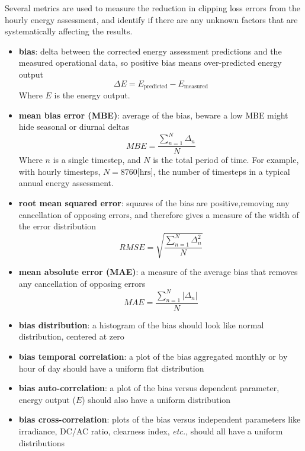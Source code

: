 \documentclass[conference]{IEEEtran}
\begin{document}
Several metrics are used to measure the reduction in clipping loss errors from the hourly energy assessment, and identify if there are any unknown factors that are systematically affecting the results.

\begin{itemize}
\item \textbf{bias}: delta between the corrected energy assessment predictions and the measured operational data, so positive bias means over-predicted energy output 
\begin{equation}
\Delta E={E_\text{predicted}} - {E_\text{measured}}\label{eq:bias}
\end{equation}
Where $E$ is the energy output.
\item \textbf{mean bias error (MBE)}: average of the bias, beware a low MBE might hide seasonal or diurnal deltas
\begin{equation}
\mathit{MBE}=\frac{\sum_{n=1}^N{\Delta_n}}{N}\label{eq:mbe}
\end{equation}
Where $n$ is a single timestep, and $N$ is the total period of time. For example, with hourly timesteps, $N=8760\text{[hrs]}$, the number of timesteps in a typical annual energy assessment.
\item \textbf{root mean squared error}: squares of the bias are positive,removing any cancellation of opposing errors, and therefore gives a measure of the width of the error distribution
\begin{equation}
\mathit{RMSE}=\sqrt{\frac{\sum_{n=1}^N{\Delta_n^2}}{N}}\label{eq:rmse}
\end{equation}
\item \textbf{mean absolute error (MAE)}: a measure of the average bias that removes any cancellation of opposing errors
\begin{equation}
\mathit{MAE}=\frac{\sum_{n=1}^N{\left|\Delta_n\right|}}{N}\label{eq:mae}
\end{equation}
\item \textbf{bias distribution}: a histogram of the bias should look like normal distribution, centered at zero
\item \textbf{bias temporal correlation}: a plot of the bias aggregated monthly or by hour of day should have a uniform flat distribution
\item \textbf{bias auto-correlation}: a plot of the bias versus dependent parameter, energy output ($E$) should also have a uniform distribution
\item \textbf{bias cross-correlation}: plots of the bias versus independent parameters like irradiance, DC/AC ratio, clearness index, \textit{etc.}, should all have a uniform distributions
\end{itemize}
\end{document}
